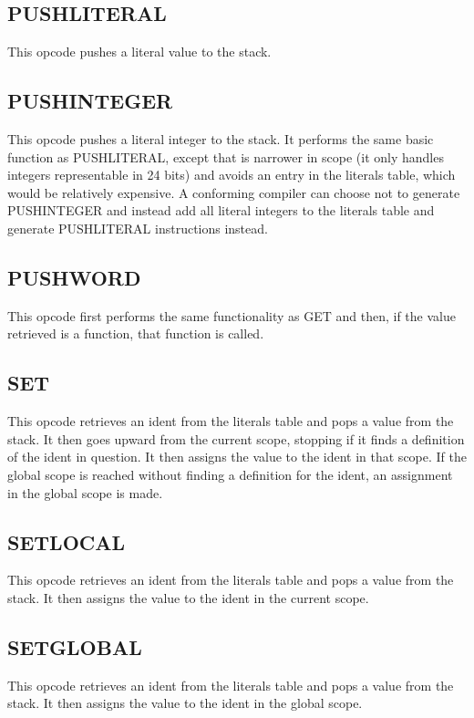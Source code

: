 \subsection{PUSH\textunderscore{}LITERAL}
\label{sec:push-literal}
This opcode pushes a literal value to the stack.

\subsection{PUSH\textunderscore{}INTEGER}
\label{sec:push-integer}
This opcode pushes a literal integer to the stack. It performs the same
basic function as PUSH\textunderscore{}LITERAL, except that is narrower
in scope (it only handles integers representable in 24 bits) and avoids
an entry in the literals table, which would be relatively expensive. A
conforming compiler can choose not to generate PUSH\textunderscore{}INTEGER
and instead add all literal integers to the literals table and generate
PUSH\textunderscore{}LITERAL instructions instead.

\subsection{PUSH\textunderscore{}WORD}
\label{sec:push-word}
This opcode first performs the same functionality as GET and then, if
the value retrieved is a function, that function is called.

\subsection{SET}
\label{sec:set}
This opcode retrieves an ident from the literals table and pops a
value from the stack. It then goes upward from the current scope,
stopping if it finds a definition of the ident in question. It then
assigns the value to the ident in that scope. If the global scope is
reached without finding a definition for the ident, an assignment in the
global scope is made.

\subsection{SET\textunderscore{}LOCAL}
\label{sec:set-local}
This opcode retrieves an ident from the literals table and pops a
value from the stack. It then assigns the value to the ident in the
current scope.

\subsection{SET\textunderscore{}GLOBAL}
\label{sec:set-global}
This opcode retrieves an ident from the literals table and pops a
value from the stack. It then assigns the value to the ident in the
global scope.

